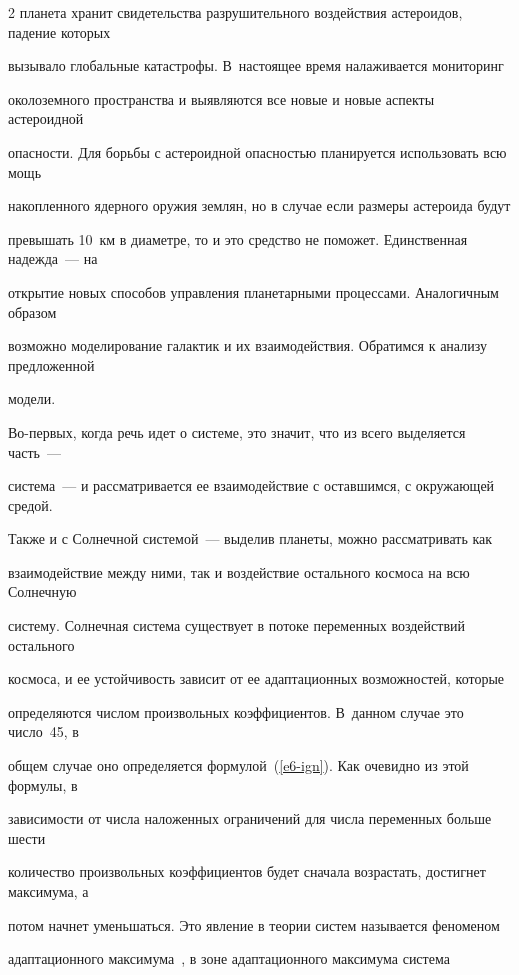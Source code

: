 \begin{multicols}{2}
планета хранит свидетельства разрушительного воздействия астероидов, падение которых 


вызывало глобальные катастрофы. В~настоящее время налаживается мониторинг 


околоземного пространства и выявляются все новые и новые аспекты астероидной 


опасности. Для борьбы с астероидной опасностью планируется использовать всю мощь 


накопленного ядерного оружия землян, но в случае если размеры астероида будут 


превышать 10~км в диаметре, то и это средство не поможет. Единственная надежда~--- на 


открытие новых способов управ\-ле\-ния планетарными процессами. Аналогичным образом 


возможно моделирование галактик и их взаимодействия. Обратимся к анализу предложенной 


модели.


      


      Во-первых, когда речь идет о системе, это значит, что из всего выделяется часть~--- 


сис\-те\-ма~--- и рассматривается ее взаимодействие с оставшимся, с окружающей средой. 


Также и с Солнечной сис\-те\-мой~--- выделив планеты, можно рассматривать как 


взаимодействие между ними, так и воздействие остального космоса на всю Солнечную 


систему. Солнечная сис\-те\-ма существует в потоке переменных воздействий остального 


космоса, и ее устойчивость зависит от ее адаптационных возможностей, которые 


определяются числом произвольных коэффициентов. В~данном случае это число~45, в 


общем случае оно определяется формулой~(\ref{e6-ign}). Как очевидно из этой формулы, в 


зависимости от числа наложенных ограничений для числа переменных больше шести 


количество произвольных коэффициентов будет сначала возрастать, достигнет максимума, а 


потом начнет уменьшаться. Это явление в теории систем называется феноменом 


адаптационного максимума~\cite{3-ign, 11-ign, 20-ign}, в зоне адаптационного максимума сис\-те\-ма 



\end{multicols}
